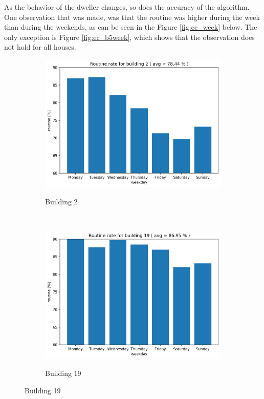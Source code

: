 As the behavior of the dweller changes, so does the accuracy of the algorithm. 
One observation that was made, was that the routine was higher during the week than during the weekends,
as can be seen in the Figure \ref{fig:ec_week} below. 
The only exception is Figure \ref{fig:ec_b5week}, which shows that the observation does not hold for all houses. 

\begin{figure}[H]
	\begin{subfigure}{.5\textwidth}
		\caption{Building 2}
		\includegraphics[width=1\linewidth]{../Figures/EC/b2week.png}
		\label{fig:ec_b2week}
	\end{subfigure}%
	~ 
	\begin{subfigure}{.5\textwidth}
		\caption{Building 19}
		\includegraphics[width=1\linewidth]{../Figures/EC/b19week.png}
		\label{fig:ec_b19week}
	\end{subfigure}%
    \bigskip


\end{figure}
